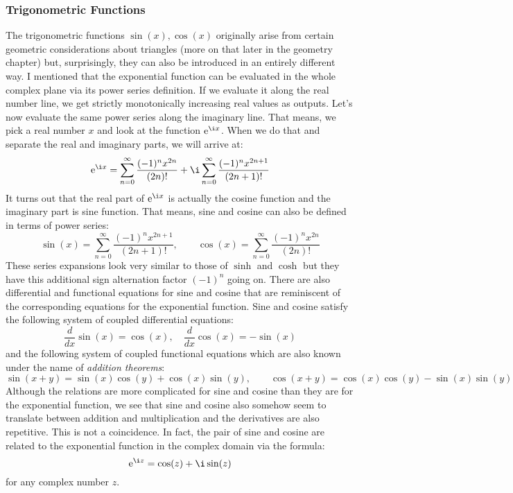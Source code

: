 \subsubsection{Trigonometric Functions}
The trigonometric functions $\sin(x), \cos(x)$ originally arise from certain geometric considerations about triangles (more on that later in the geometry chapter) but, surprisingly, they can also be introduced in an entirely different way. I mentioned that the exponential function can be evaluated in the whole complex plane via its power series definition. If we evaluate it along the real number line, we get strictly monotonically increasing real values as outputs. Let's now evaluate the same power series along the imaginary line. That means, we pick a real number $x$ and look at the function $\e^{\i x}$. When we do that and separate the real and imaginary parts, we will arrive at:
\begin{equation}
\e^{\i x} =      \sum_{n=0}^{\infty} \frac{(-1)^n x^{2n}  }{(2n)!} 
            + \i \sum_{n=0}^{\infty} \frac{(-1)^n x^{2n+1}}{(2n+1)!}
\end{equation}
It turns out that the real part of $\e^{\i x}$ is actually the cosine function and the imaginary part is sine function. That means, sine and cosine can also be defined in terms of power series:
\begin{equation}
\sin(x) = \sum_{n=0}^{\infty} \frac{(-1)^n x^{2n+1}}{(2n+1)!}, \qquad
\cos(x) = \sum_{n=0}^{\infty} \frac{(-1)^n x^{2n}  }{(2n)!}
\end{equation}
These series expansions look very similar to those of $\sinh$ and $\cosh$ but they have this additional sign alternation factor $(-1)^n$ going on. There are also differential and functional equations for sine and cosine that are reminiscent of the corresponding equations for the exponential function. Sine and cosine satisfy the following system of coupled differential equations:
\begin{equation}
\frac{d}{dx} \sin(x) = \cos(x), \quad
\frac{d}{dx} \cos(x) = -\sin(x)
\end{equation}
and the following system of coupled functional equations which are also known under the name of \emph{addition theorems}:
\begin{equation}
\sin(x+y) = \sin(x) \cos(y) + \cos(x) \sin(y), \qquad
\cos(x+y) = \cos(x) \cos(y) - \sin(x) \sin(y)
\end{equation}
Although the relations are more complicated for sine and cosine than they are for the exponential function, we see that sine and cosine also somehow seem to translate between addition and multiplication and the derivatives are also repetitive. This is not a coincidence. In fact, the pair of sine and cosine are related to the exponential function in the complex domain via the formula:
\begin{equation}
\e^{\i z} = \cos(z) + \i \sin(z)
\end{equation}
for any complex number $z$. 

